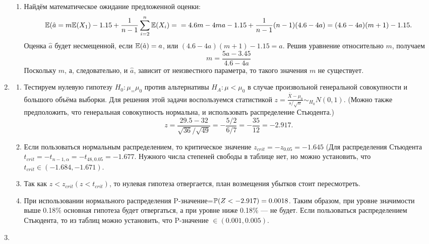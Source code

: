 \documentclass[pdftex,12pt,a4paper]{article}
\begin{document}
\begin{enumerate}
\begin{enumerate}
\item Найдём математическое ожидание предложенной оценки: 
\begin{equation}
\E(\hat{a}=m\E(X_1)-1.15+\frac{1}{n-1}\sum_{i=2}^n \E(X_i)=\\=4.6m-4ma-1.15+\frac{1}{n-1}(n-1)(4.6-4a)=(4.6-4a)(m+1)-1.15.
\end{equation}
Оценка $\hat{a}$ будет несмещенной, если $\E(\hat{a})=a$, или $(4.6-4a)(m+1)-1.15=a$. Решив уравнение относительно $m$, получаем \begin{equation}
m=\frac{5a-3.45}{4.6-4a}
\end{equation}
Поскольку $m$, а, следовательно, и $\hat{a}$, зависит от неизвестного параметра, то такого значения $m$ не существует.
\end{enumerate}
\item \begin{enumerate}
\item Тестируем нулевую гипотезу $H_0: \mu_=\mu_0$ против альтернативы $H_A:\mu<\mu_0$ в случае произвольной генеральной совокупности и большого объёма выборки. Для решения этой задачи воспользуемся статистикой $z=\frac{\bar{X}-\mu_0}{s/\sqrt{n}}\sim_{H_0} N(0,1)$. (Можно также предположить, что генеральная совокупность нормальна, и использовать распределение Стьюдента.)\\
\begin{equation}
z=\frac{29.5-32}{\sqrt{36}/\sqrt{49}}=-\frac{5/2}{6/7}=-\frac{35}{12}=-2.917.
\end{equation}
\item Если пользоваться нормальным распределением, то критическое значение $z_{crit}=-z_{0.05}=-1.645$ (Для распределения Стьюдента $t_{crit}=-t_{n-1,\alpha}=-t_{48,0.05}=-1.677.$ Нужного числа степеней свободы в таблице нет, но можно установить, что $t_{crit} \in (-1.684,-1.671).$
\item Так как $z<z_{crit} (z<t_{crit})$, то нулевая гипотеза отвергается, план возмещения убытков стоит пересмотреть.
\item При использовании нормального распределения P-значение=$\P(Z<-2.917)=0.0018$. Таким образом, при уровне значимости выше 0.18\% основная гипотеза будет отвергаться, а при уровне ниже 0.18\% --- не будет. Если пользоваться распределением Стьюдента, то из таблиц можно установить, что P-значение $\in (0.001,0.005)$.
\end{enumerate}
\item \begin{enumerate}


\end{enumerate}
\end{enumerate}
\end{document}
